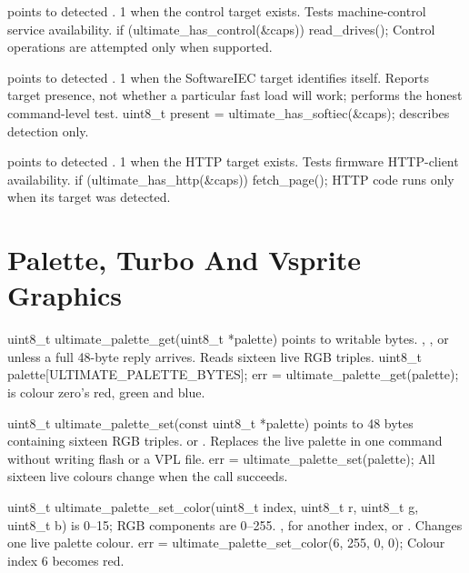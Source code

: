 \begin{referencechapter}
{ points to detected
\hyperref[struct:ultimate-capabilities]{}.}
{1 when the control target exists.}
{Tests machine-control service availability.}
{if (ultimate\_has\_control(\&caps)) read\_drives();}
{Control operations are attempted only when supported.}

{ points to detected
\hyperref[struct:ultimate-capabilities]{}.}
{1 when the SoftwareIEC target identifies itself.}
{Reports target presence, not whether a particular fast load will work;
 performs the honest command-level test.}
{uint8\_t present = ultimate\_has\_softiec(\&caps);}
{ describes detection only.}

{ points to detected
\hyperref[struct:ultimate-capabilities]{}.}
{1 when the HTTP target exists.}
{Tests firmware HTTP-client availability.}
{if (ultimate\_has\_http(\&caps)) fetch\_page();}
{HTTP code runs only when its target was detected.}

\section{Palette, Turbo And Vsprite Graphics}

{uint8\_t ultimate\_palette\_get(uint8\_t *palette)}
{ points to  writable bytes.}
{, , or
 unless a full 48-byte reply arrives.}
{Reads sixteen live RGB triples.}
{uint8\_t palette[ULTIMATE\_PALETTE\_BYTES]; err = ultimate\_palette\_get(palette);}
{ is colour zero's red, green and blue.}

{uint8\_t ultimate\_palette\_set(const uint8\_t *palette)}
{ points to 48 bytes containing sixteen RGB triples.}
{ or .}
{Replaces the live palette in one command without writing flash or a VPL file.}
{err = ultimate\_palette\_set(palette);}
{All sixteen live colours change when the call succeeds.}

{uint8\_t ultimate\_palette\_set\_color(uint8\_t index, uint8\_t r, uint8\_t g, uint8\_t b)}
{ is 0--15; RGB components are 0--255.}
{,  for another index,
or .}
{Changes one live palette colour.}
{err = ultimate\_palette\_set\_color(6, 255, 0, 0);}
{Colour index 6 becomes red.}


\end{referencechapter}
